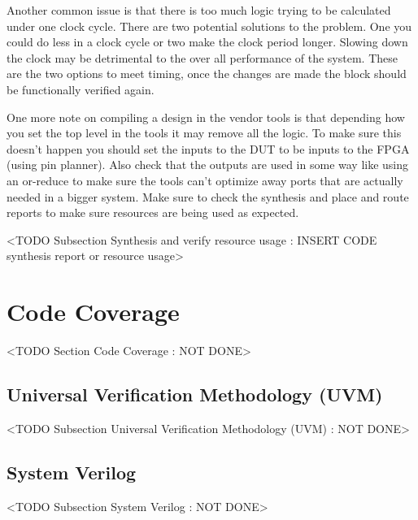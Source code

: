 Another common issue is that there is too much logic trying to be calculated under one clock cycle. There are two potential solutions to the problem. One you could do less in a clock cycle or two make the clock period longer. Slowing down the clock may be detrimental to the over all performance of the system. These are the two options to meet timing, once the changes are made the block should be functionally verified again.  

One more note on compiling a design in the vendor tools is that depending how you set the top level in the tools it may remove all the logic. To make sure this doesn't happen you should set the inputs to the \ac{DUT} to be inputs to the FPGA (using pin planner). Also check that the outputs are used in some way like using an or-reduce to make sure the tools can't optimize away ports that are actually needed in a bigger system. Make sure to check the synthesis and place and route reports to make sure resources are being used as expected. 
	
	<TODO Subsection Synthesis and verify resource usage : INSERT CODE synthesis report or resource usage>
	
\section{Code Coverage}
	<TODO Section Code Coverage : NOT DONE>

\subsection{Universal Verification Methodology (UVM)}
	<TODO Subsection Universal Verification Methodology (UVM) : NOT DONE>

\subsection{System Verilog}
	<TODO Subsection System Verilog : NOT DONE>


